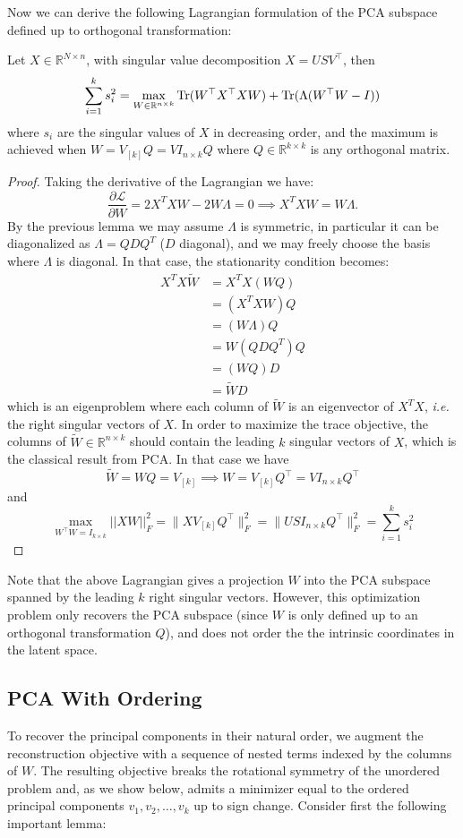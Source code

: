 \documentclass[twoside,11pt]{article}
\begin{document}
Now we can derive the following Lagrangian formulation of the PCA subspace defined up to orthogonal transformation:
\begin{theorem}Let $X \in \mathbb{R}^{N \times n}$, with singular value decomposition $X=USV^\top$, then 
\[ \sum_{i=1}^k s_i^2 = \max_{W \in \mathbb{R}^{n \times k}} {\rm Tr}(W^\top X^\top X W) + {\rm Tr}(\Lambda(W^\top W - I)) \]
where $s_i$ are the singular values of $X$ in decreasing order, and the maximum is achieved when $W=V_{[k]}Q=VI_{n\times k}Q$ where $Q \in \mathbb{R}^{k\times k}$ is any orthogonal matrix.
\end{theorem}
\begin{proof}
Taking the derivative of the Lagrangian we have:
\[\frac{\partial\mathcal{L}}{\partial W} = 2X^TXW - 2W\Lambda= 0\implies X^TXW = W\Lambda.\]
 By the previous lemma we may assume $\Lambda$ is symmetric, in particular it can be diagonalized as $\Lambda = QDQ^T$ ($D$ diagonal), and we may freely choose the basis where $\Lambda$ is diagonal. In that case, the stationarity condition becomes:
\begin{align*}
    X^TX\tilde W &= X^TX(WQ)
    \\&= (X^TXW)Q\\&=
    (W\Lambda)Q\\&=
    W(QDQ^T)Q\\&=
    (WQ)D\\&=
    \tilde WD
\end{align*}
which is an eigenproblem where each column of $\tilde W$ is an eigenvector of $X^TX$, \emph{i.e.} the right singular vectors of $X$. In order to maximize the trace objective, the columns of $\tilde W\in\mathbb{R}^{n\times k}$ should contain the leading $k$ singular vectors of $X$, which is the classical result from PCA. In that case we have \[\tilde W= WQ = V_{[k]}\implies W = V_{[k]}Q^\top = VI_{n\times k}Q^\top\]
and \[\max_{W^\top W = I_{k\times k}} ||X W||_F^2 = \|XV_{[k]}Q^\top\|_F^2 = \|USI_{n\times k}Q^\top\|_F^2 = \sum_{i=1}^ks_i^2\]
\end{proof}
Note that the above Lagrangian gives a projection $W$ into the PCA subspace spanned by the leading $k$ right singular vectors. However, this optimization problem only recovers the PCA subspace (since $W$ is only defined up to an orthogonal transformation $Q$), and does not order the the intrinsic coordinates in the latent space.


\subsection{PCA With Ordering}
\label{subsec:with_order}
To recover the principal components in their natural order, we augment the reconstruction objective with a sequence of nested terms indexed by the columns of $W$. The resulting objective breaks the rotational symmetry of the unordered problem and, as we show below, admits a minimizer equal to the ordered principal components $v_1, v_2, \dots, v_k$ up to sign change. Consider first the following important lemma:
\end{document}
